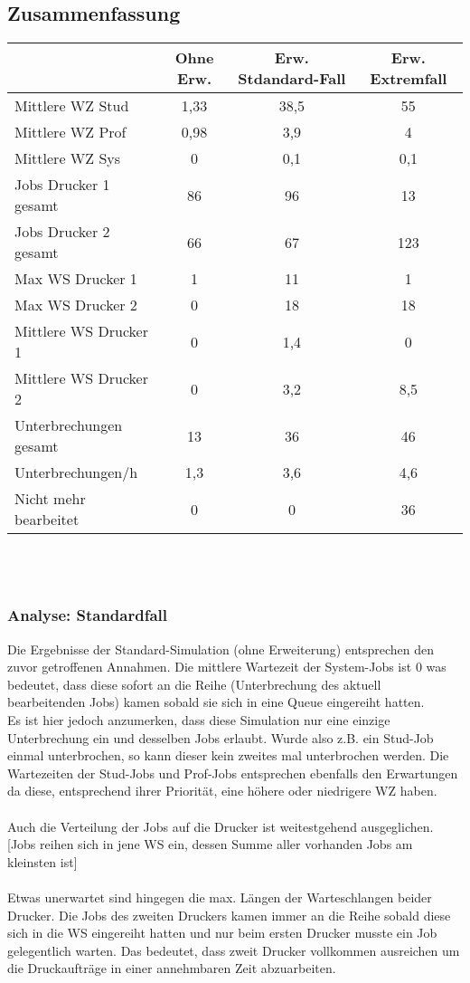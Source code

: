 \documentclass[12pt,a4paper]{article}
\begin{document}
	\subsection{Zusammenfassung}
	\begin{tabular}{|l|c|c|c|}
		\hline  & Ohne Erw. & Erw. Stdandard-Fall & Erw. Extremfall \\ 
		\hline Mittlere WZ Stud 	   & 1,33 & 38,5 & 55 \\ 
		\hline Mittlere WZ Prof 	   & 0,98 & 3,9 & 4 \\ 
		\hline Mittlere WZ Sys 		   & 0 & 0,1 & 0,1 \\ 
		\hline Jobs Drucker 1 gesamt   & 86 & 96 & 13 \\ 
		\hline Jobs Drucker 2 gesamt   & 66 & 67 & 123 \\ 
		\hline Max WS Drucker 1 	   & 1 & 11 & 1 \\ 
		\hline Max WS Drucker 2 	   & 0 & 18 & 18 \\ 
		\hline Mittlere WS Drucker 1   & 0 & 1,4 & 0 \\ 
		\hline Mittlere WS Drucker 2   & 0 & 3,2 & 8,5 \\
		\hline Unterbrechungen gesamt  & 13 & 36 & 46 \\  
		\hline Unterbrechungen/h 	   & 1,3 & 3,6 & 4,6 \\ 
		\hline Nicht mehr bearbeitet   & 0 & 0 & 36 \\
		\hline 
	\end{tabular}
	\\	
	\\
	\subsubsection{Analyse: Standardfall}
	Die Ergebnisse der Standard-Simulation (ohne Erweiterung) entsprechen den zuvor getroffenen Annahmen. Die mittlere Wartezeit der System-Jobs ist 0 was bedeutet, dass diese sofort an die Reihe
	 (Unterbrechung des aktuell bearbeitenden Jobs) kamen sobald sie sich in eine Queue eingereiht hatten. \\
	Es ist hier jedoch anzumerken, dass diese Simulation nur eine einzige Unterbrechung ein und desselben Jobs erlaubt. Wurde also z.B. ein Stud-Job einmal unterbrochen, so kann dieser kein zweites mal
	 unterbrochen werden.
	Die Wartezeiten der Stud-Jobs und Prof-Jobs entsprechen ebenfalls den Erwartungen da diese, entsprechend ihrer Priorität, eine höhere oder niedrigere WZ haben.\\
	\\
	Auch die Verteilung der Jobs auf die Drucker ist weitestgehend ausgeglichen.
	[Jobs reihen sich in jene WS ein, dessen Summe aller vorhanden Jobs am kleinsten ist]\\
	\\
	Etwas unerwartet sind hingegen die max. Längen der Warteschlangen beider Drucker. Die Jobs des zweiten Druckers kamen immer an die Reihe sobald diese sich in die WS eingereiht hatten und nur beim
	 ersten Drucker musste ein Job gelegentlich warten. Das bedeutet, dass zweit Drucker vollkommen ausreichen um die Druckaufträge in einer annehmbaren Zeit abzuarbeiten.\\
	
\end{document}
